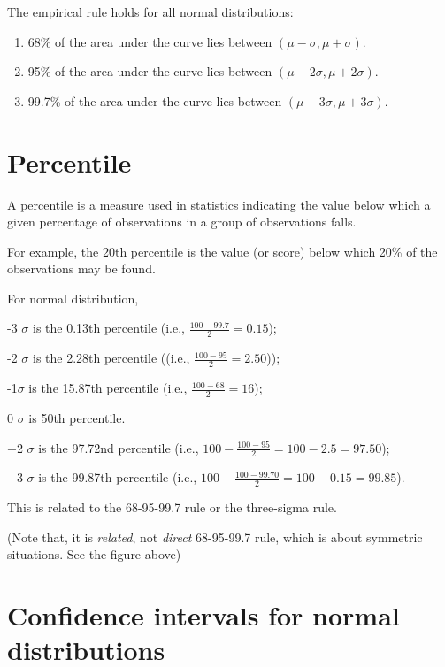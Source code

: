 \documentclass[
]{book}
\begin{document}
The empirical rule holds for all normal distributions:

\begin{enumerate}
\def\labelenumi{(\arabic{enumi})}
\item
  68\% of the area under the curve lies between \((\mu-\sigma,\mu+\sigma)\).
\item
  95\% of the area under the curve lies between \((\mu-2\sigma,\mu+2\sigma)\).
\item
  99.7\% of the area under the curve lies between \((\mu-3\sigma,\mu+3\sigma)\).
\end{enumerate}

\hypertarget{percentile}{%
\section{Percentile}\label{percentile}}

A percentile is a measure used in statistics indicating the value below which a given percentage of observations in a group of observations falls.

For example, the 20th percentile is the value (or score) below which 20\% of the observations may be found.

For normal distribution,

-3 \(\sigma\) is the 0.13th percentile (i.e., \(\frac{100-99.7}{2}=0.15\));

-2 \(\sigma\) is the 2.28th percentile ((i.e., \(\frac{100-95}{2}=2.50\)));

-1\(\sigma\) is the 15.87th percentile (i.e., \(\frac{100-68}{2}=16\));

0 \(\sigma\) is 50th percentile.

+2 \(\sigma\) is the 97.72nd percentile (i.e., \(100-\frac{100-95}{2}=100-2.5=97.50\));

+3 \(\sigma\) is the 99.87th percentile (i.e., \(100-\frac{100-99.70}{2}=100-0.15=99.85\)).

This is related to the 68-95-99.7 rule or the three-sigma rule.

(Note that, it is \emph{related}, not \emph{direct} 68-95-99.7 rule, which is about symmetric situations. See the figure above)

\hypertarget{confidence-intervals-for-normal-distributions}{%
\section{Confidence intervals for normal distributions}\label{confidence-intervals-for-normal-distributions}}
\end{document}
